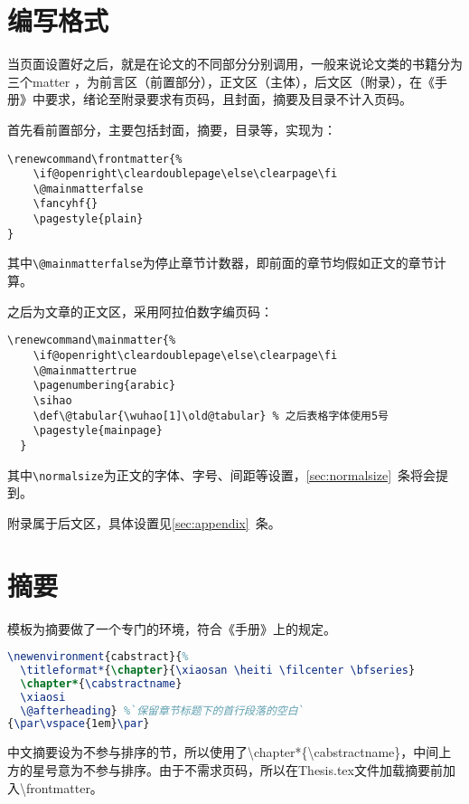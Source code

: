 \section{编写格式}
当页面设置好之后，就是在论文的不同部分分别调用，一般来说论文类的书籍分为三个matter ，为前言区（前置部分），正文区（主体），后文区（附录），在《手册》中要求，绪论至附录要求有页码，且封面，摘要及目录不计入页码。

首先看前置部分，主要包括封面，摘要，目录等，实现为：
\begin{lstlisting}
\renewcommand\frontmatter{%
    \if@openright\cleardoublepage\else\clearpage\fi
    \@mainmatterfalse
	\fancyhf{}
    \pagestyle{plain}
}
\end{lstlisting}
其中\verb|\@mainmatterfalse|为停止章节计数器，即前面的章节均假如正文的章节计算。

之后为文章的正文区，采用阿拉伯数字编页码：
\begin{lstlisting}
\renewcommand\mainmatter{%
    \if@openright\cleardoublepage\else\clearpage\fi
    \@mainmattertrue
    \pagenumbering{arabic}
    \sihao
    \def\@tabular{\wuhao[1]\old@tabular} % 之后表格字体使用5号
    \pagestyle{mainpage}
  }
\end{lstlisting}
其中\verb|\normalsize|为正文的字体、字号、间距等设置，\ref{sec:normalsize}~条将会提到。

附录属于后文区，具体设置见\ref{sec:appendix}~条。

\section{摘要}
模板为摘要做了一个专门的环境，符合《手册》上的规定。
\begin{lstlisting}[language=TeX]
\newenvironment{cabstract}{%
  \titleformat*{\chapter}{\xiaosan \heiti \filcenter \bfseries}
  \chapter*{\cabstractname}
  \xiaosi
  \@afterheading} %`保留章节标题下的首行段落的空白`
{\par\vspace{1em}\par}
\end{lstlisting}
中文摘要设为不参与排序的节，所以使用了\textbackslash chapter*\{\textbackslash cabstractname\}，中间上方的星号意为不参与排序。由于不需求页码，所以在Thesis.tex文件加载摘要前加入\textbackslash frontmatter。

